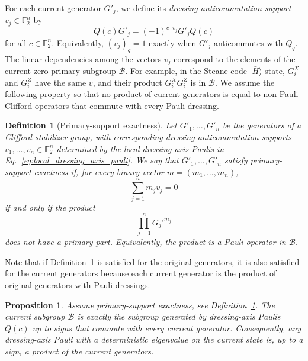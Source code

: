 \documentclass[
 reprint,
 amsmath,amssymb,
 pra,superscriptaddress, nofootinbib
]{revtex4-2}
\newtheorem{definition}{Definition}
\newtheorem{proposition}{Proposition}
\theoremstyle{definition}
\theoremstyle{plain}
\begin{document}
For each current generator $G'_j$, we define its \emph{dressing-anticommutation support} 
$v_j\in\mathbb{F}^n_2$ by
\begin{equation}
  Q(c)G'_j=(-1)^{c\cdot v_j}G'_jQ(c)
  \label{eq:dressing_primary_anti}
\end{equation}
for all $c\in\mathbb{F}_2^n$. Equivalently, $(v_j)_q=1$ exactly when $G'_j$ anticommutes with $Q_q$. The linear dependencies among the vectors $v_j$ correspond to the elements of the current zero-primary subgroup $\mathcal{B}$. For example, in the Steane code $|\bar{H}\rangle$ state, $G_i^X$ and $G_i^Z$ have the same $v$, and their product $G_i^X G_i^Z$ is in $\mathcal{B}$.
We assume the following property so that no product of current generators is equal to non-Pauli Clifford operators that commute with every Pauli dressing.

\begin{definition}[Primary-support exactness]
\label{def:primary_support_exactness}
Let $G'_1,\ldots,G'_n$ be the generators of a Clifford-stabilizer group, with corresponding dressing-anticommutation supports
$v_1,\ldots,v_n\in\mathbb{F}_2^n$ determined by the local dressing-axis Paulis in Eq.~\eqref{eq:local_dressing_axis_pauli}. We say that $G'_1,\ldots,G'_n$ satisfy primary-support exactness if, for every binary vector $m=(m_1,\ldots,m_n)$,
\begin{equation}
  \sum_{j=1}^n m_jv_j=0
\end{equation}
if and only if the product
\begin{equation}
  \prod_{j=1}^n G_j'^{m_j}
\end{equation}
does not have a primary part. Equivalently, the product is a Pauli operator in $\mathcal{B}$.
\end{definition}

Note that if Definition~\ref{def:primary_support_exactness} is satisfied for the original generators, it is also satisfied for the current generators because each current generator is the product of original generators with Pauli dressings.

\begin{proposition}
\label{prop:completeness}
Assume primary-support exactness, see Definition~\ref{def:primary_support_exactness}. The current subgroup $\mathcal{B}$ is exactly the subgroup generated by dressing-axis Paulis $Q(c)$ up to signs that commute with every current generator. Consequently, any dressing-axis Pauli with a deterministic eigenvalue on the current state is, up to a sign, a product of the current generators.
\end{proposition}
\end{document}
